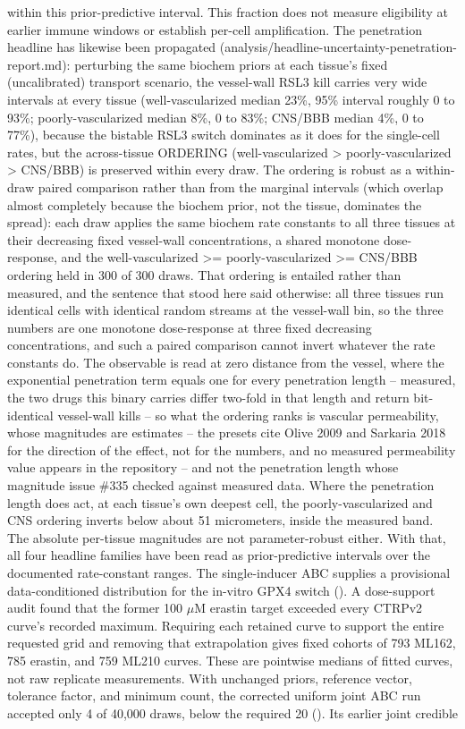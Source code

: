 \documentclass[11pt,twoside,openright]{report}
\begin{document}
\begin{enumerate}
within this prior-predictive interval. This fraction does not measure eligibility at earlier immune windows or establish per-cell amplification. The penetration headline has likewise been propagated (analysis/headline-uncertainty-penetration-report.md): perturbing the same biochem priors at each tissue's fixed (uncalibrated) transport scenario, the vessel-wall RSL3 kill carries very wide intervals at every tissue (well-vascularized median 23\%, 95\% interval roughly 0 to 93\%; poorly-vascularized median 8\%, 0 to 83\%; CNS/BBB median 4\%, 0 to 77\%), because the bistable RSL3 switch dominates as it does for the single-cell rates, but the across-tissue ORDERING (well-vascularized > poorly-vascularized > CNS/BBB) is preserved within every draw. The ordering is robust as a within-draw paired comparison rather than from the marginal intervals (which overlap almost completely because the biochem prior, not the tissue, dominates the spread): each draw applies the same biochem rate constants to all three tissues at their decreasing fixed vessel-wall concentrations, a shared monotone dose-response, and the well-vascularized >= poorly-vascularized >= CNS/BBB ordering held in 300 of 300 draws. That ordering is entailed rather than measured, and the sentence that stood here said otherwise: all three tissues run identical cells with identical random streams at the vessel-wall bin, so the three numbers are one monotone dose-response at three fixed decreasing concentrations, and such a paired comparison cannot invert whatever the rate constants do. The observable is read at zero distance from the vessel, where the exponential penetration term equals one for every penetration length -- measured, the two drugs this binary carries differ two-fold in that length and return bit-identical vessel-wall kills -- so what the ordering ranks is vascular permeability, whose magnitudes are estimates -- the presets cite Olive 2009 and Sarkaria 2018 for the direction of the effect, not for the numbers, and no measured permeability value appears in the repository -- and not the penetration length whose magnitude issue \#335 checked against measured data. Where the penetration length does act, at each tissue's own deepest cell, the poorly-vascularized and CNS ordering inverts below about 51 micrometers, inside the measured band. The absolute per-tissue magnitudes are not parameter-robust either. With that, all four headline families have been read as prior-predictive intervals over the documented rate-constant ranges. The single-inducer ABC supplies a provisional data-conditioned distribution for the in-vitro GPX4 switch (). A dose-support audit found that the former 100 $\mu$M erastin target exceeded every CTRPv2 curve's recorded maximum. Requiring each retained curve to support the entire requested grid and removing that extrapolation gives fixed cohorts of 793 ML162, 785 erastin, and 759 ML210 curves. These are pointwise medians of fitted curves, not raw replicate measurements. With unchanged priors, reference vector, tolerance factor, and minimum count, the corrected uniform joint ABC run accepted only 4 of 40,000 draws, below the required 20 (). Its earlier joint credible 
\end{enumerate}
\end{document}
